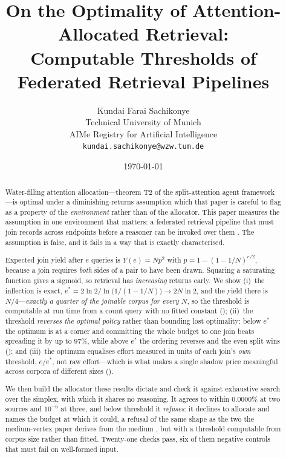 \documentclass[11pt,twocolumn,a4paper]{article}
\title{\textbf{On the Optimality of Attention-Allocated Retrieval:\\[3pt]
Computable Thresholds of Federated Retrieval Pipelines}}
\author{%
Kundai Farai Sachikonye\\
\small Technical University of Munich\\
\small AIMe Registry for Artificial Intelligence\\
\small \texttt{kundai.sachikonye@wzw.tum.de}}
\date{\today}
\theoremstyle{thmstyle}
\theoremstyle{definition}
\theoremstyle{remark}
\newcommand{\eff}{e}
\newcommand{\estar}{e^{*}}
\newcommand{\yield}{Y}
\begin{document}
\maketitle

\begin{abstract}
\noindent
Water-filling attention allocation---theorem T2 of the split-attention
agent framework \citep{sachikonye2026splitattention}---is optimal under a
diminishing-returns assumption which that paper is careful to flag as a
property of the \emph{environment} rather than of the allocator. This
paper measures the assumption in one environment that matters: a
federated retrieval pipeline that must join records across endpoints
before a reasoner can be invoked over them
\citep{doerr2025limits,sachikonye2026tacat}. The assumption is false, and
it fails in a way that is exactly characterised.

Expected join yield after $\eff$ queries is
$\yield(\eff)=N p^{2}$ with $p=1-(1-1/N)^{\eff/2}$, because a join
requires \emph{both} sides of a pair to have been drawn. Squaring a
saturating function gives a sigmoid, so retrieval has \emph{increasing}
returns early. We show (i)~the inflection is exact,
$\estar=2\ln 2/\ln\!\big(1/(1-1/N)\big)\to 2N\ln 2$, and the yield there
is $N/4$---\emph{exactly a quarter of the joinable corpus for every $N$},
so the threshold is computable at run time from a count query with no
fitted constant (); (ii)~the threshold \emph{reverses
the optimal policy} rather than bounding lost optimality: below $\estar$
the optimum is at a corner and committing the whole budget to one join
beats spreading it by up to $97\%$, while above $\estar$ the ordering
reverses and the even split wins (); and (iii)~the
optimum equalises effort measured in units of each join's \emph{own}
threshold, $\eff/\estar$, not raw effort---which is what makes a single
shadow price meaningful across corpora of different sizes
().

We then build the allocator these results dictate and check it against
exhaustive search over the simplex, with which it shares no reasoning.
It agrees to within $0.0000\%$ at two sources and $10^{-6}$ at three, and
below threshold it \emph{refuses}: it declines to allocate and names the
budget at which it could, a refusal of the same shape as the two the
medium-vertex paper derives from the medium
\citep{sachikonye2026medium}, but with a threshold computable from corpus
size rather than fitted. Twenty-one checks pass, six of them negative
controls that must fail on well-formed input.


\end{abstract}
\end{document}
